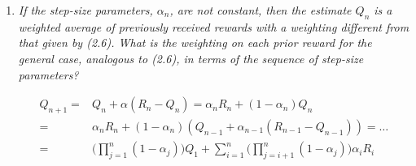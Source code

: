 \documentclass[12pt,a4paper]{article}
\begin{document}
\begin{enumerate}
\item
  \textit{If the step-size parameters, $\alpha_n$, are not constant, then the estimate $Q_n$ is
  a weighted average of previously received rewards with a weighting different from that
  given by (2.6). What is the weighting on each prior reward for the general case, analogous
  to (2.6), in terms of the sequence of step-size parameters?}

  \begin{align*}
  Q_{n + 1} = & Q_n + \alpha(R_n - Q_n) = \alpha_n R_n + (1 - \alpha_n)Q_n \\
  = & \alpha_n R_n + (1 - \alpha_n)(Q_{n - 1} + \alpha_{n - 1}(R_{n - 1} - Q_{n - 1})) = \dots \\
  = & \Big(\prod\limits_{j = 1}^n (1 - \alpha_j)\Big) Q_1 +
  \sum\limits_{i = 1}^n \Big(\prod\limits_{j = i + 1}^n (1 - \alpha_j) \Big)\alpha_i R_i \\
  \end{align*}


\end{enumerate}
\end{document}

